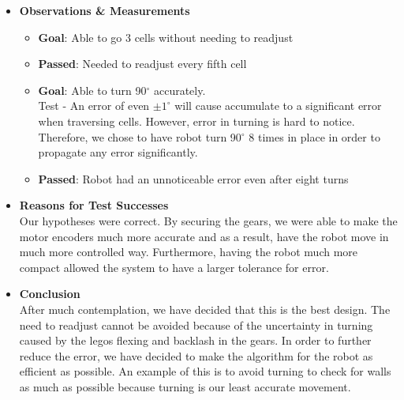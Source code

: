\documentclass[11pt]{article}
\begin{document}
\begin{itemize}
\item \textbf{Observations \& Measurements}
	\begin{itemize}
	\item \textbf{Goal}: Able to go 3 cells without needing to readjust
 	\item \textbf{Passed}: Needed to readjust every fifth cell
 	\item \textbf{Goal}: Able to turn 90$^{\circ}$ accurately.\\
	Test - An error of even $ \pm 1^{\circ}$ will cause accumulate to a significant error when traversing cells. However, error in turning is hard to notice. Therefore, we chose to have robot turn 90$^{\circ}$ 8 times in place in order to propagate any error significantly. 
	\item \textbf{Passed}: Robot had an unnoticeable error even after eight turns
	\end{itemize}
\item \textbf{Reasons for Test Successes}\\
Our hypotheses were correct. By securing the gears, we were able to make the motor encoders much more accurate and as a result, have the robot move in much more controlled way. Furthermore, having the robot much more compact allowed the system to have a larger tolerance for error.
\item \textbf{Conclusion}\\
After much contemplation, we have decided that this is the best design. The need to readjust cannot be avoided because of the uncertainty in turning caused by the legos flexing and backlash in the gears. In order to further reduce the error, we have decided to make the algorithm for the robot as efficient as possible. An example of this is to avoid turning to check for walls as much as possible because turning is our least accurate movement.
\end{itemize}
\newpage

\end{document}

